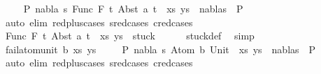 \begin{isabellebody}
\ \ \isamarkupfalse%
\ {\isachardoublequoteopen}{\isasymnot}\ {\isacharparenleft}{\kern0pt}{\isasymexists}P{}\ nabla\ s{\isachardot}{\kern0pt}\ {\isacharparenleft}{\kern0pt}{\isacharparenleft}{\kern0pt}Func\ F\ t{}{\isacharcomma}{\kern0pt}\ Abst\ a\ t{\isacharparenright}{\kern0pt}\ {\isacharhash}{\kern0pt}\ xs{\isacharcomma}{\kern0pt}\ ys{\isacharparenright}{\kern0pt}\ {\isasymTurnstile}\ {\isacharparenleft}{\kern0pt}nabla{\isacharcomma}{\kern0pt}s{\isacharparenright}{\kern0pt}\ {\isasymRightarrow}\ P{}{\isacharparenright}{\kern0pt}{\isachardoublequoteclose}\isanewline
\ \ \ \ \isamarkupfalse%
\ {\isacharparenleft}{\kern0pt}auto\ elim{\isacharcolon}{\kern0pt}\ red{\isacharunderscore}{\kern0pt}plus{\isachardot}{\kern0pt}cases\ s{\isacharunderscore}{\kern0pt}red{\isachardot}{\kern0pt}cases\ c{\isacharunderscore}{\kern0pt}red{\isachardot}{\kern0pt}cases{\isacharparenright}{\kern0pt}\isanewline
\ \ \isamarkupfalse%
\ \isamarkupfalse%
\ {\isachardoublequoteopen}{\isacharparenleft}{\kern0pt}{\isacharparenleft}{\kern0pt}Func\ F\ t{}{\isacharcomma}{\kern0pt}\ Abst\ a\ t{\isacharparenright}{\kern0pt}\ {\isacharhash}{\kern0pt}\ xs{\isacharcomma}{\kern0pt}\ ys{\isacharparenright}{\kern0pt}\ {\isasymin}\ stuck{\isachardoublequoteclose}\isanewline
\ \ \ \ \isamarkupfalse%
\ stuck{\isacharunderscore}{\kern0pt}def\ \isamarkupfalse%
\ simp\isanewline
{}\isamarkupfalse%
\isanewline
\ \ \isamarkupfalse%
\ {\isacharparenleft}{\kern0pt}fail{\isacharunderscore}{\kern0pt}atom{\isacharunderscore}{\kern0pt}unit\ b\ xs\ ys{\isacharparenright}{\kern0pt}\isanewline
\ \ \isamarkupfalse%
\ {\isachardoublequoteopen}{\isasymnot}\ {\isacharparenleft}{\kern0pt}{\isasymexists}P{}\ nabla\ s{\isachardot}{\kern0pt}\ {\isacharparenleft}{\kern0pt}{\isacharparenleft}{\kern0pt}Atom\ b{\isacharcomma}{\kern0pt}\ Unit{\isacharparenright}{\kern0pt}\ {\isacharhash}{\kern0pt}\ xs{\isacharcomma}{\kern0pt}\ ys{\isacharparenright}{\kern0pt}\ {\isasymTurnstile}\ {\isacharparenleft}{\kern0pt}nabla{\isacharcomma}{\kern0pt}s{\isacharparenright}{\kern0pt}\ {\isasymRightarrow}\ P{}{\isacharparenright}{\kern0pt}{\isachardoublequoteclose}\isanewline
\ \ \ \ \isamarkupfalse%
\ {\isacharparenleft}{\kern0pt}auto\ elim{\isacharcolon}{\kern0pt}\ red{\isacharunderscore}{\kern0pt}plus{\isachardot}{\kern0pt}cases\ s{\isacharunderscore}{\kern0pt}red{\isachardot}{\kern0pt}cases\ c{\isacharunderscore}{\kern0pt}red{\isachardot}{\kern0pt}cases{\isacharparenright}{\kern0pt}\isanewline

\end{isabellebody}
